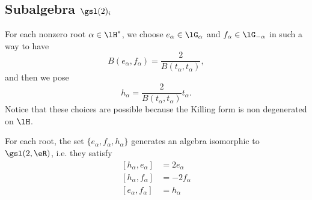 \subsection{Subalgebra \texorpdfstring{$ \gsl(2)_i$}{SL2R} }
\label{SubSecCopiedeSLdansGi}

For each nonzero root \( \alpha\in\lH^*\), we choose \( e_{\alpha}\in\lG_{\alpha}\) and \( f_{\alpha}\in\lG_{-\alpha}\) in such a way to have
\begin{equation}
    B(e_{\alpha},f_{\alpha})=\frac{ 2 }{ B(t_{\alpha},t_{\alpha}) },
\end{equation}
and then we pose
\begin{equation}
    h_{\alpha}=\frac{ 2 }{ B(t_{\alpha},t_{\alpha}) }t_{\alpha}.
\end{equation}
Notice that these choices are possible because the Killing form is non degenerated on \( \lH\). 

\begin{proposition} \label{PropWEzZYzC}
    For each root, the set $\{ e_{\alpha},f_{\alpha},h_{\alpha} \}$ generates an algebra isomorphic to $\gsl(2,\eR)$, i.e. they satisfy
    \begin{subequations}
        \begin{align}
            [h_{\alpha},e_{\alpha}]&=2e_{\alpha}\\
            [h_{\alpha},f_{\alpha}]&=-2f_{\alpha}\\
            [e_{\alpha},f_{\alpha}]&=h_{\alpha}\\
        \end{align}
    \end{subequations}
\end{proposition}

